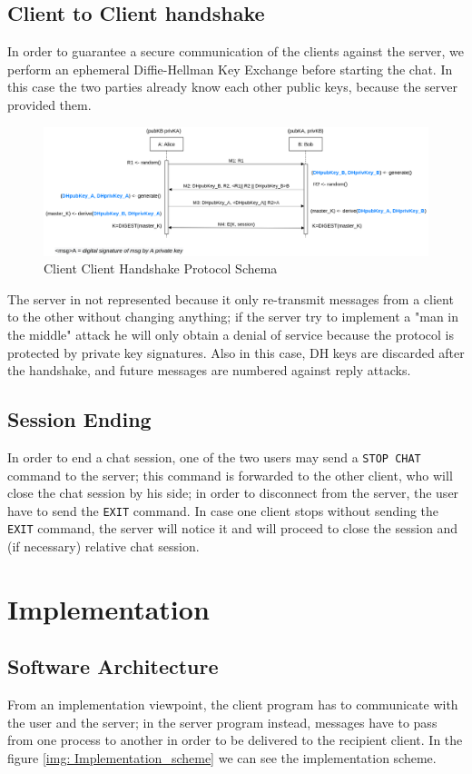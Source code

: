 \documentclass[11pt]{report}
\begin{document}
\section{Client to Client handshake}
In order to guarantee a secure communication of the clients against the server, we perform an ephemeral 
Diffie-Hellman Key Exchange before starting the chat. In this case the two parties already know each other
public keys, because the server provided them. 

\begin{figure}[H]
	\centering
	\includegraphics[scale=0.19]{img/AuthClientClient.png}
	\caption{Client Client Handshake Protocol Schema}
	\label {img: AuthClientClient}
\end{figure}

\noindent The server in not represented because it only re-transmit messages from a client to the other without changing
anything; if the server try to implement a "man in the middle" attack he will only obtain a denial of service
because the protocol is protected by private key signatures. Also in this case, DH keys are discarded after 
the handshake, and future messages are numbered against reply attacks.

\section{Session Ending}
In order to end a chat session, one of the two users may send a \texttt{STOP CHAT} command to the server; this
command is forwarded to the other client, who will close the chat session by his side; in order to disconnect from the server, the user have to send the 
\texttt{EXIT} command. In case one client stops without sending the \texttt{EXIT} command, the server will notice 
it and will proceed to close the session and (if necessary) relative chat session.


\chapter{Implementation}
\section{Software Architecture}
From an implementation viewpoint, the client program has to communicate with the user and the server; in the
server program instead, messages have to pass from one process to another in order to be delivered to the
recipient client. In the figure \ref{img: Implementation_scheme} we can see the implementation scheme.
\end{document}
